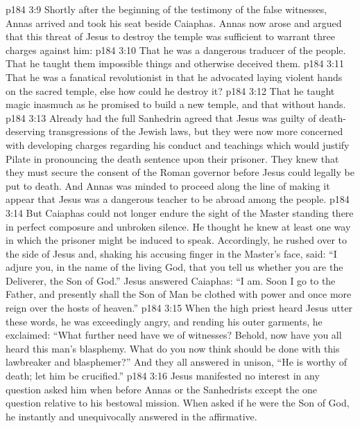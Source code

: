 \vs p184 3:9 Shortly after the beginning of the testimony of the false witnesses, Annas arrived and took his seat beside Caiaphas. Annas now arose and argued that this threat of Jesus to destroy the temple was sufficient to warrant three charges against him:
\vs p184 3:10 \bibnobreakspace That he was a dangerous traducer of the people. That he taught them impossible things and otherwise deceived them.
\vs p184 3:11 \bibnobreakspace That he was a fanatical revolutionist in that he advocated laying violent hands on the sacred temple, else how could he destroy it?
\vs p184 3:12 \bibnobreakspace That he taught magic inasmuch as he promised to build a new temple, and that without hands.
\vs p184 3:13 \pc Already had the full Sanhedrin agreed that Jesus was guilty of death\hyp{}deserving transgressions of the Jewish laws, but they were now more concerned with developing charges regarding his conduct and teachings which would justify Pilate in pronouncing the death sentence upon their prisoner. They knew that they must secure the consent of the Roman governor before Jesus could legally be put to death. And Annas was minded to proceed along the line of making it appear that Jesus was a dangerous teacher to be abroad among the people.
\vs p184 3:14 But Caiaphas could not longer endure the sight of the Master standing there in perfect composure and unbroken silence. He thought he knew at least one way in which the prisoner might be induced to speak. Accordingly, he rushed over to the side of Jesus and, shaking his accusing finger in the Master’s face, said: “I adjure you, in the name of the living God, that you tell us whether you are the Deliverer, the Son of God.” Jesus answered Caiaphas: \textcolor{ubdarkred}{“I am. Soon I go to the Father, and presently shall the Son of Man be clothed with power and once more reign over the hosts of heaven.”}
\vs p184 3:15 When the high priest heard Jesus utter these words, he was exceedingly angry, and rending his outer garments, he exclaimed: “What further need have we of witnesses? Behold, now have you all heard this man’s blasphemy. What do you now think should be done with this lawbreaker and blasphemer?” And they all answered in unison, “He is worthy of death; let him be crucified.”
\vs p184 3:16 Jesus manifested no interest in any question asked him when before Annas or the Sanhedrists except the one question relative to his bestowal mission. When asked if he were the Son of God, he instantly and unequivocally answered in the affirmative.
